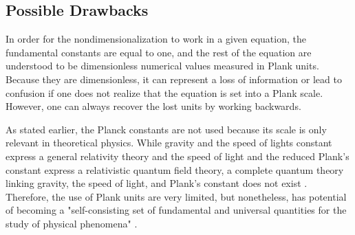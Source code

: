 \documentclass[a4paper,11pt]{book}
\begin{document}
\hfill 

\subsection{Possible Drawbacks}
In order for the nondimensionalization to work in a given equation, the fundamental constants are equal to one, and the rest of the equation are understood to be dimensionless numerical values measured in Plank units. Because they are dimensionless, it can represent a loss of information or lead to confusion if one does not realize that the equation is set into a Plank scale. However, one can always recover the lost units by working backwards.

\hfill

As stated earlier, the Planck constants are not used because its scale is only relevant in theoretical physics. While gravity and the speed of lights constant express a general relativity theory and the speed of light and the reduced Plank's constant express a relativistic quantum field theory, a complete quantum theory linking gravity, the speed of light, and Plank's constant does not exist \cite{University New South Wales}. Therefore, the use of Plank units are very limited, but nonetheless, has potential of becoming a "self-consisting set of fundamental and universal quantities for the study of physical phenomena" \cite{Buczyna}. 
\end{document}
